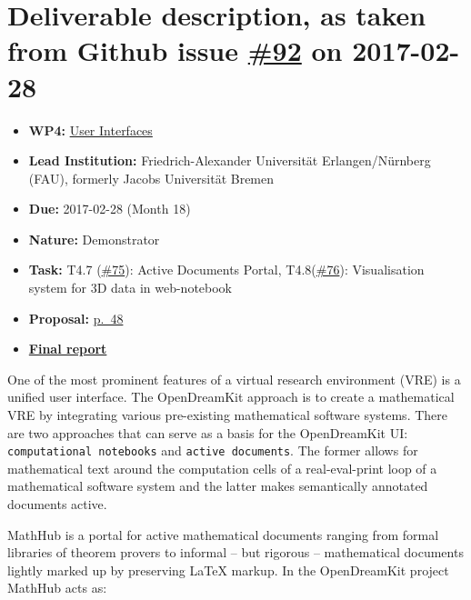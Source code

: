 \section*{\texorpdfstring{Deliverable description, as taken from Github
issue
\href{https://github.com/OpenDreamKit/OpenDreamKit/issues/92}{\#92} on
2017-02-28}{Deliverable description, as taken from Github issue \#92 on 2017-02-28}}\label{deliverable-description-as-taken-from-github-issue-92-on-2017-02-28}

\begin{itemize}
\tightlist
\item
  \textbf{WP4:}
  \href{https://github.com/OpenDreamKit/OpenDreamKit/tree/master/WP4}{User
  Interfaces}
\item
  \textbf{Lead Institution:} Friedrich-Alexander Universität
  Erlangen/Nürnberg (FAU), formerly Jacobs Universität Bremen
\item
  \textbf{Due:} 2017-02-28 (Month 18)
\item
  \textbf{Nature:} Demonstrator
\item
  \textbf{Task:} T4.7
  (\href{https://github.com/OpenDreamKit/OpenDreamKit/issues/75}{\#75}):
  Active Documents Portal,
  T4.8(\href{https://github.com/OpenDreamKit/OpenDreamKit/issues/76}{\#76}):
  Visualisation system for 3D data in web-notebook
\item
  \textbf{Proposal:}
  \href{https://github.com/OpenDreamKit/OpenDreamKit/raw/master/Proposal/proposal-www.pdf}{p.~48}
\item
  \href{https://github.com/OpenDreamKit/OpenDreamKit/raw/master/WP4/D4.3/report-final.pdf}{\textbf{Final
  report}}
\end{itemize}

One of the most prominent features of a virtual research environment
(VRE) is a unified user interface. The OpenDreamKit approach is to
create a mathematical VRE by integrating various pre-existing
mathematical software systems. There are two approaches that can serve
as a basis for the OpenDreamKit UI: \texttt{computational\ notebooks}
and \texttt{active\ documents}. The former allows for mathematical text
around the computation cells of a real-eval-print loop of a mathematical
software system and the latter makes semantically annotated documents
active.

MathHub is a portal for active mathematical documents ranging from
formal libraries of theorem provers to informal -- but rigorous --
mathematical documents lightly marked up by preserving LaTeX markup. In
the OpenDreamKit project MathHub acts as:

